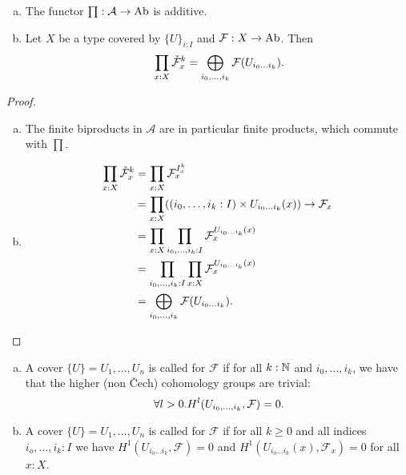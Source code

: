 \begin{remark}
  \label{cech-sheaf-pi-direct-sum}
  \begin{enumerate}[(a)]
  \item The functor $\prod:\mathcal A \to \operatorname{Ab}$ is additive.
  \item Let $X$ be a type covered by $\{U\}_{i:I}$ and $\mathcal F : X\to \operatorname{Ab}$.
    Then 
    \[
      \prod_{x:X} \check{\mathcal F}^k_x=\bigoplus_{i_0,\dots,i_k}\mathcal F(U_{i_0\dots i_k})
      \rlap{.}
    \]
  \end{enumerate}
\end{remark}

\begin{proof}
  \begin{enumerate}[(a)]
  \item The finite biproducts in $\mathcal A$ are in particular finite products, which commute with $\prod$.
  \item \begin{align*}
          \prod_{x:X} \check{\mathcal F}^k_x &= \prod_{x:X} \mathcal F_x^{I^k_x} \\
                                             &= \prod_{x:X} ((i_0, \dots, i_k:I)\times U_{i_0\dots i_k}(x))\to \mathcal F_x \\
                                             &= \prod_{x:X} \prod_{i_0, \dots, i_k:I} \mathcal F_x^{U_{i_0\dots i_k}(x)} \\
                                             &= \prod_{i_0, \dots, i_k:I} \prod_{x:X} \mathcal F_x^{U_{i_0\dots i_k}(x)} \\
                                             &= \bigoplus_{i_0,\dots,i_k}\mathcal F(U_{i_0\dots i_k})\rlap{.}
        \end{align*}
  \end{enumerate}
\end{proof}

\begin{definition}
  \begin{enumerate}[(a)]
  \item A cover $\{U\}=U_1,\dots,U_n$ is called  for $\mathcal F$
    if for all $k:\mathbb{N}$ and $i_0,\dots,i_k$, we have that the higher (non Čech) cohomology groups are trivial:
    \[
      \forall l>0. H^l(U_{i_0,\dots,i_k},\mathcal F)=0\rlap{.}
    \]
  \item A cover $\{U\}=U_1,\dots,U_n$ is called   for $\mathcal F$
    if for all $k\geq 0$ and all indices $i_o,\dots,i_k:I$ we have $H^1(U_{i_0\dots i_k},\mathcal F)=0$ and $H^1(U_{i_0\dots i_k}(x),\mathcal F_x)=0$ for all $x:X$.
  \end{enumerate}
\end{definition}

